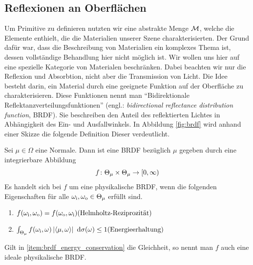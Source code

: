 
	\subsection{Reflexionen an Oberflächen} %
	\label{sub:reflexionen_an_oberflächen}

		Um Primitive zu definieren nutzten wir eine abstrakte Menge $\mathcal{M}$, welche die Elemente enthielt, die die Materialien unserer Szene charakterisierten.
		Der Grund dafür war, dass die Beschreibung von Materialien ein komplexes Thema ist, dessen vollständige Behandlung hier nicht möglich ist.
		Wir wollen uns hier auf eine spezielle Kategorie von Materialen beschränken.
		Dabei beachten wir nur die Reflexion und Absorbtion, nicht aber die Transmission von Licht.
		Die Idee besteht darin, ein Material durch eine geeignete Funktion auf der Oberfläche zu charakterisieren.
		Diese Funktionen nennt man \enquote{Bidirektionale Reflektanzverteilungsfunktionen} (engl.: \textit{bidirectional reflectance distribution function}, BRDF).
		Sie beschreiben den Anteil des reflektierten Lichtes in Abhängigkeit des Ein- und Ausfallwinkels.
		In Abbildung \ref{fig:brdf} wird anhand einer Skizze die folgende Definition Dieser verdeutlicht.
		\begin{definition}[BRDF]
			Sei $\mu\in\Omega$ eine Normale.
			Dann ist eine BRDF bezüglich $\mu$ gegeben durch eine integrierbare Abbildung
			\[
				f\colon\Theta_\mu\times\Theta_\mu\to[0,\infty)
			\]
			Es handelt sich bei $f$ um eine physikalische BRDF, wenn die folgenden Eigenschaften für alle $\omega_{\mathrm{i}},\omega_{\mathrm{o}}\in\Theta_\mu$ erfüllt sind.
			\begin{enumerate}[label = \normalfont{(\roman*)}]
				\item $f(\omega_\m{i},\omega_\m{o}) = f(\omega_\m{o},\omega_\m{i}) \hfill \text{(Helmholtz-Reziprozität)}$
				\item \label{item:brdf_energy_conservation} $\integral{\Theta_\mu}{}{f(\omega_\m{i},\omega) \abs{\dotp{\mu}{\omega}}}{\sigma(\omega)} \leq 1 \hfill \text{(Energieerhaltung)}$
			\end{enumerate}
			Gilt in \ref{item:brdf_energy_conservation} die Gleichheit, so nennt man $f$ auch eine ideale physikalische BRDF.
		\end{definition}

